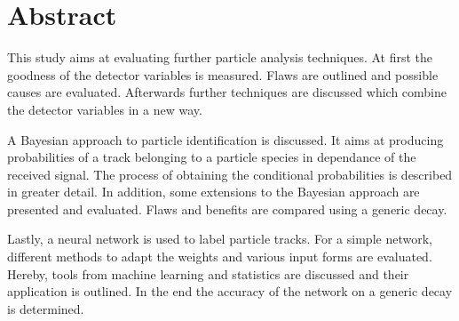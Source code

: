 \chapter*{Abstract}

This study aims at evaluating further particle analysis techniques.
At first the goodness of the detector variables is measured. Flaws are outlined and possible causes are evaluated. Afterwards further techniques are discussed which combine the detector variables in a new way.

A Bayesian approach to particle identification is discussed. It aims at producing probabilities of a track belonging to a particle species in dependance of the received signal. The process of obtaining the conditional probabilities is described in greater detail. In addition, some extensions to the Bayesian approach are presented and evaluated. Flaws and benefits are compared using a generic decay.

Lastly, a neural network is used to label particle tracks. For a simple network, different methods to adapt the weights and various input forms are evaluated. Hereby, tools from machine learning and statistics are discussed and their application is outlined. In the end the accuracy of the network on a generic decay is determined.
